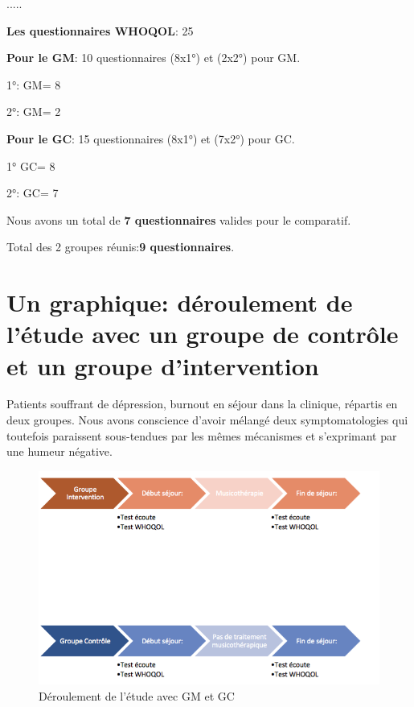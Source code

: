 .....


\textbf{Les questionnaires WHOQOL}: 25

     \textbf{Pour le GM}:      
     10 questionnaires (8x1°) et (2x2°) pour GM.
     
     1°: GM= 8 

     
     2°: GM= 2
   
     
\textbf{ Pour le GC}:
15 questionnaires (8x1°) et (7x2°) pour GC.
    
     1° GC= 8
     
     2°: GC= 7
     
     Nous avons un total de \textbf{7 questionnaires} valides pour le
     comparatif.
     
Total des 2 groupes réunis:\textbf{9 questionnaires}.
    
 
     
          
 
 
 	
 	
       

 	
 	\section{Un graphique: déroulement de l'étude avec un groupe
          de contrôle et un groupe d'intervention}





                                      Patients souffrant de dépression, burnout
                                               en séjour dans la
                                               clinique, répartis en
                                               deux groupes.
                                               Nous avons conscience
                                               d'avoir mélangé deux
                                               symptomatologies qui
                                               toutefois paraissent
                                               sous-tendues par les
                                               mêmes mécanismes et
                                               s'exprimant par une
                                               humeur négative.

\begin{figure}
\centering
\includegraphics[width=0.7\linewidth]{images/Groupecontrole.png}
\caption[Schéma du déroulement]{Déroulement de l'étude avec GM et GC}
       
\label{groupecontroleimage1}
\end{figure}



